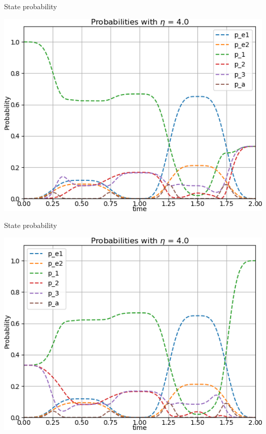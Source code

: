 \documentclass[t]{beamer}
\begin{document}
\begin{frame}{State probability}
\begin{center}
\includegraphics[scale=0.7]{pop_plot_H100.png}
\end{center}
\end{frame}


\begin{frame}{State probability}
\begin{center}
\includegraphics[scale=0.7]{pop_plot_H111.png}
\end{center}
\end{frame}
\end{document}
